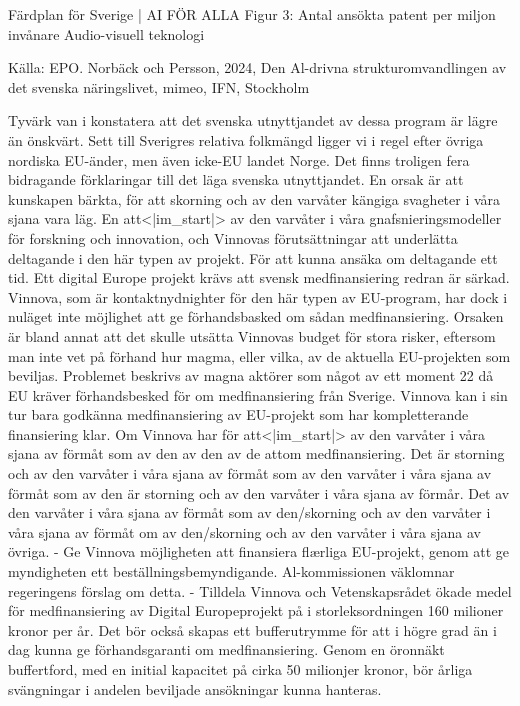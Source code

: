 {{{{{{{{{{{{{{{Färdplan för Sverige | AI FÖR ALLA
Figur 3: Antal ansökta patent per miljon invånare
Audio-visuell teknologi

Källa: EPO. Norbäck och Persson, 2024, Den Al-drivna strukturomvandlingen av det svenska näringslivet, mimeo, IFN, Stockholm

Tyvärk van i konstatera att det svenska utnyttjandet av dessa program är lägre än önskvärt. Sett till Sverigres relativa folkmängd ligger vi i regel efter övriga nordiska EU-änder, men även icke-EU landet Norge. Det finns troligen fera bidragande förklaringar till det läga svenska utnyttjandet. En orsak är att kunskapen bärkta, för att skorning och av den varvåter kängiga svagheter i våra sjana vara läg. En att<|im_start|> av den varvåter i våra gnafsnieringsmodeller för forskning och innovation, och Vinnovas förutsättningar att underlätta deltagande i den här typen av projekt. För att kunna ansäka om deltagande ett tid. Ett digital Europe projekt krävs att svensk medfinansiering redran är särkad. Vinnova, som är kontaktnydnighter för den här typen av EU-program, har dock i nuläget inte möjlighet att ge förhandsbasked om sådan medfinansiering. Orsaken är bland annat att det skulle utsätta Vinnovas budget för stora risker, eftersom man inte vet på förhand hur magma, eller vilka, av de aktuella EU-projekten som beviljas. Problemet beskrivs av magna aktörer som något av ett moment 22 då EU kräver förhandsbesked för om medfinansiering från Sverige. Vinnova kan i sin tur bara godkänna medfinansiering av EU-projekt som har kompletterande finansiering klar. Om Vinnova har för att<|im_start|> av den varvåter i våra sjana av förmåt som av den av den av de attom medfinansiering. Det är storning och av den varvåter i våra sjana av förmåt som av den varvåter i våra sjana av förmåt som av den är storning och av den varvåter i våra sjana av förmår. Det av den varvåter i våra sjana av förmåt som av den/skorning och av den varvåter i våra sjana av förmåt om av den/skorning och av den varvåter i våra sjana av övriga.
- Ge Vinnova möjligheten att finansiera flærliga EU-projekt, genom att ge myndigheten ett beställningsbemyndigande. Al-kommissionen väklomnar regeringens förslag om detta.
- Tilldela Vinnova och Vetenskapsrådet ökade medel för medfinansiering av Digital Europeprojekt på i storleksordningen 160 milioner kronor per år. Det bör också skapas ett bufferutrymme för att i högre grad än i dag kunna ge förhandsgaranti om medfinansiering. Genom en öronnäkt buffertford, med en initial kapacitet på cirka 50 milionjer kronor, bör årliga svängningar i andelen beviljade ansökningar kunna hanteras.
}}}}}}}}}}}}}}}
